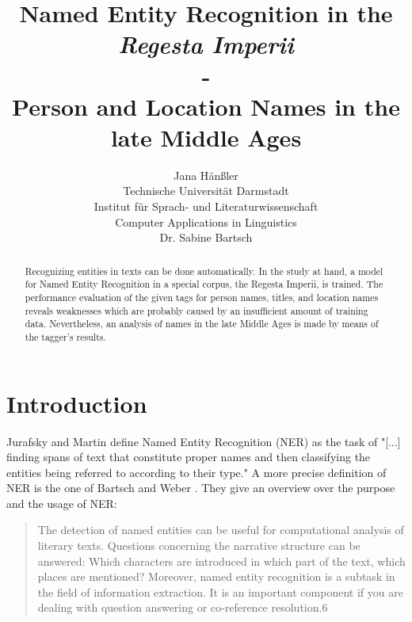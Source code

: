 \documentclass[11pt,a4paper]{article}
\title{Named Entity Recognition in the \textit{Regesta Imperii} \\-\\ Person and Location Names in the late Middle Ages}
\author{Jana H{\"a}n{\ss}ler \\
  Technische Universit{\"a}t Darmstadt  \\
  Institut f{\"u}r Sprach- und Literaturwissenschaft \\
  Computer Applications in Linguistics\\
  Dr. Sabine Bartsch
}
\date{}
\begin{document}
\maketitle
\begin{abstract}
	Recognizing entities in texts can be done automatically. In the study at hand, a model for Named Entity Recognition in a special corpus, the Regesta Imperii, is trained. The performance evaluation of the given tags for person names, titles, and location names reveals weaknesses which are probably caused by an insufficient amount of training data. Nevertheless, an analysis of names in the late Middle Ages is made by means of the tagger's results.
\end{abstract}

\section{Introduction}
\label{cha:intro}
Jurafsky and Martin \cite{jurafsky_speech_2017} define Named Entity Recognition (NER) as the task of "[...] finding spans of text that constitute proper names and then classifying the entities being referred to according to their type." A more precise definition of NER is the one of Bartsch and Weber \cite{bartsch_linguisticsweb:tutorials:linguistics_tutorials:automaticannotation:stanford_ner_2015}. They give an overview over the purpose and the usage of NER:

\begin{quote}
The detection of named entities can be useful for computational analysis of literary texts. Questions concerning the narrative structure can be answered: Which characters are introduced in which part of the text, which places are mentioned? Moreover, named entity recognition is a subtask in the field of information extraction. It is an important component if you are dealing with question answering or co-reference resolution.6
\end{quote}
\end{document}
